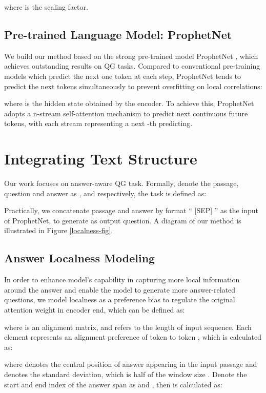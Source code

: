 \documentclass[11pt]{article}
\begin{document}
where  is the scaling factor.





\subsection{Pre-trained Language Model: ProphetNet}
We build our method based on the strong pre-trained model ProphetNet \citep{qi-etal-2020-prophetnet}, which achieves outstanding results on QG tasks. Compared to conventional pre-training models which predict the next one token at each step, ProphetNet tends to predict the next  tokens simultaneously to prevent overfitting on local correlations:

where  is the hidden state obtained by the encoder. To achieve this, ProphetNet adopts a n-stream self-attention mechanism to predict next  continuous future tokens, with each stream representing a next -th predicting. 


\section{Integrating Text Structure}

Our work focuses on answer-aware QG task. Formally,
denote the passage, question and answer as ,  and  respectively, the task is defined as:

Practically, we concatenate passage and answer by format `` [SEP] '' as the input of ProphetNet, to generate  as output question. A diagram of our method is illustrated in Figure \ref{localness-fig}.





\subsection{Answer Localness Modeling}
In order to enhance model's capability in capturing more local information around the answer and enable the model to generate more answer-related questions, 
we model localness as a preference bias to regulate the original attention weight in encoder end, which can be defined as:

where  is an alignment matrix, and  refers to the length of input sequence. Each element  represents an alignment preference of token  to token , which is calculated as:

where  denotes the central position of answer appearing in the input passage and  denotes the standard deviation, which is half of the window size . Denote the start and end index of the answer span as  and , then  is calculated as:
\end{document}
